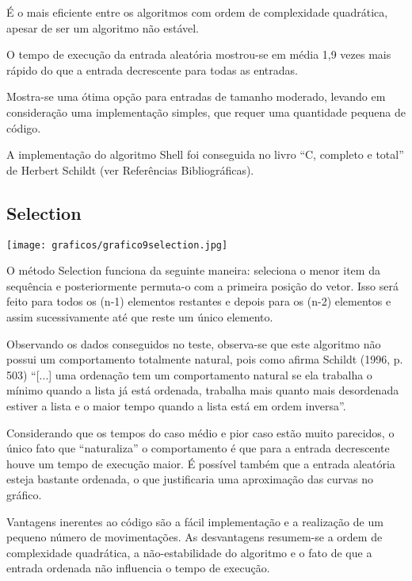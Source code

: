 \documentclass[12pt,a4paper]{article}
\begin{document}
É o mais eficiente entre os algoritmos com ordem de complexidade quadrática, apesar de ser um algoritmo não estável.

O tempo de execução da entrada aleatória mostrou-se em média 1,9 vezes mais rápido do que a entrada decrescente para todas as entradas. 

Mostra-se uma ótima opção para entradas de tamanho moderado, levando em consideração uma implementação simples, que requer uma quantidade pequena de código.

A implementação do algoritmo Shell foi conseguida no livro “C, completo e total” de Herbert Schildt (ver Referências Bibliográficas).





\subsection{Selection}
\begin{center}
\texttt{[image: graficos/grafico9selection.jpg]}
\end{center}

O método Selection funciona da seguinte maneira: seleciona o menor item da sequência e posteriormente permuta-o com a primeira posição do vetor. Isso será feito para todos os (n-1) elementos restantes e depois para os (n-2) elementos e assim sucessivamente até que reste um único elemento. 

Observando os dados conseguidos no teste, observa-se que este algoritmo não possui um comportamento totalmente natural, pois como afirma Schildt (1996, p. 503) “[...] uma ordenação tem um comportamento natural se ela trabalha o mínimo quando a lista já está ordenada, trabalha mais quanto mais desordenada estiver a lista e o maior tempo quando a lista está em ordem inversa”. 

Considerando que os tempos do caso médio e pior caso estão muito parecidos, o único fato que “naturaliza” o comportamento é que para a entrada decrescente houve um tempo de execução maior.  É possível também que a entrada aleatória esteja bastante ordenada, o que justificaria uma aproximação das curvas no gráfico.

Vantagens inerentes ao código são a fácil implementação e a realização de um pequeno número de movimentações. As desvantagens resumem-se a ordem de complexidade quadrática, a não-estabilidade do algoritmo e o fato de que a entrada ordenada não influencia o tempo de execução. 
\end{document}
